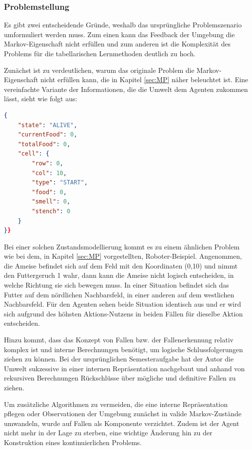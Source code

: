 \subsubsection{Problemstellung}
Es gibt zwei entscheidende Gründe, weshalb das ursprüngliche Problemszenario umformuliert werden muss. Zum einen kann das Feedback der Umgebung die Markov-Eigenschaft nicht erfüllen und zum anderen ist die Komplexität des Problems für die tabellarischen Lernmethoden deutlich zu hoch.
\par
Zunächst ist zu verdeutlichen, warum das originale Problem die Markov-Eigenschaft nicht erfüllen kann, die in Kapitel \ref{sec:MP} näher beleuchtet ist. Eine vereinfachte Variante der Informationen, die die Umwelt dem Agenten zukommen lässt, sieht wie folgt aus:
\begin{lstlisting}[language=json,firstnumber=1, label=lst:ursprüngliche Wahrnehmung,caption=bar]
{
    "state": "ALIVE",
    "currentFood": 0,
    "totalFood": 0,
    "cell": {
        "row": 0,
        "col": 10,
        "type": "START",
        "food": 0,
        "smell": 0,
        "stench": 0
    }
}}
\end{lstlisting}
Bei einer solchen Zustandsmodellierung kommt es zu einem ähnlichen Problem wie bei dem, in Kapitel \ref{sec:MP} vorgestellten, Roboter-Beispiel. Angenommen, die Ameise befindet sich auf dem Feld mit den Koordinaten (0,10) und nimmt den Futtergeruch 1 wahr, dann kann die Ameise nicht logisch entscheiden, in welche Richtung sie sich bewegen muss. In einer Situation befindet sich das Futter auf dem nördlichen Nachbarsfeld, in einer anderen auf dem westlichen Nachbarsfeld. Für den Agenten sehen beide Situation identisch aus und er wird sich aufgrund des höhsten Aktions-Nutzens in beiden Fällen für dieselbe Aktion entscheiden.
\par 
Hinzu kommt, dass das Konzept von Fallen bzw. der Fallenerkennung relativ komplex ist und interne Berechnungen benötigt, um logische Schlussfolgerungen ziehen zu können. Bei der ursprünglichen Semesteraufgabe hat der Autor die Umwelt sukzessive in einer internen Repräsentation nachgebaut und anhand von rekursiven Berechnungen Rückschlüsse über mögliche und definitive Fallen zu ziehen.
\par 
Um zusätzliche Algorithmen zu vermeiden, die eine interne Repräsentation pflegen oder Observationen der Umgebung zunächst in valide Markov-Zustände umwandeln, wurde  
auf Fallen als Komponente verzichtet. Zudem ist der Agent nicht mehr in der Lage zu sterben, eine wichtige Änderung hin zu der Konstruktion eines kontinuierlichen Problems.   

